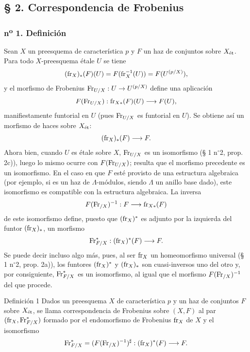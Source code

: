 \subsection*{§ 2. Correspondencia de Frobenius}

\subsubsection*{n\textsuperscript{o} 1. Definición}

Sean $X$ un preesquema de característica $p$ y $F$ un haz de conjuntos sobre $X_{\mathrm{\acute{e}t}}$. Para todo $X$-preesquema étale $U$ se tiene
\[
(\operatorname{fr}_X)_*(F)(U)=F(\operatorname{fr}_X^{-1}(U))=F(U^{(p/X)}),
\]
y el morfismo de Frobenius $\operatorname{Fr}_{U/X}:U\to U^{(p/X)}$ define una aplicación
\[
F(\operatorname{Fr}_{U/X}):\operatorname{fr}_{X*}(F)(U)\longrightarrow F(U),
\]
manifiestamente funtorial en $U$ (pues $\operatorname{Fr}_{U/X}$ es funtorial en $U$). Se obtiene así un morfismo de haces sobre $X_{\mathrm{\acute{e}t}}$:
\[
(\operatorname{fr}_X)_*(F)\longrightarrow F.
\]
Ahora bien, cuando $U$ es étale sobre $X$, $\operatorname{Fr}_{U/X}$ es un isomorfismo (§ 1 n$^\circ$2, prop. 2c)), luego lo mismo ocurre con $F(\operatorname{Fr}_{U/X})$; resulta que el morfismo precedente es un isomorfismo. En el caso en que $F$ esté provisto de una estructura algebraica (por ejemplo, si es un haz de $\Lambda$-módulos, siendo $\Lambda$ un anillo base dado), este isomorfismo es compatible con la estructura algebraica. La inversa
\[
F(\operatorname{Fr}_{/X})^{-1}:F\longrightarrow \operatorname{fr}_{X*}(F)
\]
de este isomorfismo define, puesto que $(\operatorname{fr}_X)^*$ es adjunto por la izquierda del funtor $(\operatorname{fr}_X)_*$, un morfismo
\[
\operatorname{Fr}^*_{F/X}:(\operatorname{fr}_X)^*(F)\longrightarrow F.
\]
Se puede decir incluso algo más, pues, al ser $\operatorname{fr}_X$ un homeomorfismo universal (§ 1 n$^\circ$2, prop. 2a)), los funtores $(\operatorname{fr}_X)^*$ y $(\operatorname{fr}_X)_*$ son cuasi-inversos uno del otro y, por consiguiente, $\operatorname{Fr}^*_{F/X}$ es un isomorfismo, al igual que el morfismo $F(\operatorname{Fr}_{/X})^{-1}$ del que procede.

\begin{statement}{Definición 1}
Dados un preesquema $X$ de característica $p$ y un haz de conjuntos $F$ sobre $X_{\mathrm{\acute{e}t}}$, se llama correspondencia de Frobenius sobre $(X,F)$ al par $(\operatorname{fr}_X,\operatorname{Fr}^*_{F/X})$ formado por el endomorfismo de Frobenius $\operatorname{fr}_X$ de $X$ y el isomorfismo
\[
\operatorname{Fr}^*_{F/X}=(F(\operatorname{Fr}_{/X})^{-1})^\sharp:(\operatorname{fr}_X)^*(F)\longrightarrow F.
\]
\end{statement}
